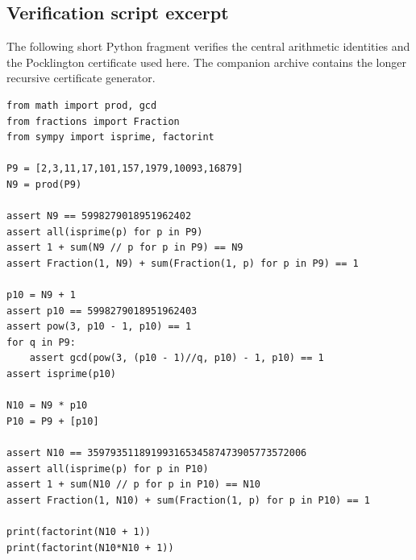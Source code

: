 \documentclass[11pt]{amsart}
\theoremstyle{plain}
\theoremstyle{definition}
\theoremstyle{remark}
\begin{document}
\subsection{Verification script excerpt}
The following short Python fragment verifies the central arithmetic identities and the Pocklington certificate used here.  The companion archive contains the longer recursive certificate generator.

\begin{lstlisting}[style=pythonsmall]
from math import prod, gcd
from fractions import Fraction
from sympy import isprime, factorint

P9 = [2,3,11,17,101,157,1979,10093,16879]
N9 = prod(P9)

assert N9 == 5998279018951962402
assert all(isprime(p) for p in P9)
assert 1 + sum(N9 // p for p in P9) == N9
assert Fraction(1, N9) + sum(Fraction(1, p) for p in P9) == 1

p10 = N9 + 1
assert p10 == 5998279018951962403
assert pow(3, p10 - 1, p10) == 1
for q in P9:
    assert gcd(pow(3, (p10 - 1)//q, p10) - 1, p10) == 1
assert isprime(p10)

N10 = N9 * p10
P10 = P9 + [p10]

assert N10 == 35979351189199316534587473905773572006
assert all(isprime(p) for p in P10)
assert 1 + sum(N10 // p for p in P10) == N10
assert Fraction(1, N10) + sum(Fraction(1, p) for p in P10) == 1

print(factorint(N10 + 1))
print(factorint(N10*N10 + 1))
\end{lstlisting}
\end{document}
